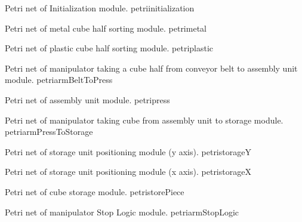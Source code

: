 {Petri net of Initialization module.}
{petriinitialization}
\newpage


\newpage
{}
{Petri net of metal cube half sorting module.}
{petrimetal}
\newpage


\newpage
{}
{Petri net of plastic cube half sorting module.}
{petriplastic}
\newpage


\newpage
{}
{Petri net of manipulator taking a cube half from conveyor belt to assembly unit
  module.}
{petriarmBeltToPress}
\newpage


\clearpage
\pagebreak
{}
{Petri net of assembly unit module.}
{petripress}
\newpage


\newpage
{}
{Petri net of manipulator taking cube from assembly unit to storage module.}
{petriarmPressToStorage}
\newpage


\newpage
{}
{Petri net of storage unit positioning module (y axis).}
{petristorageY}
\newpage


\newpage
{}
{Petri net of storage unit positioning module (x axis).}
{petristorageX}
\newpage


\newpage
{}
{Petri net of cube storage module.}
{petristorePiece}
\newpage




\newpage

{Petri net of manipulator Stop Logic module.}
{petriarmStopLogic}

\newpage






